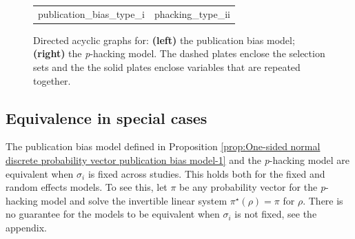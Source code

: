 \documentclass{article}
\theoremstyle{plain}
\theoremstyle{definition}
\begin{document}
\begin{figure}
\begin{center}     
 \begin{tabular}{cc}    
  {publication_bias_type_i} &     
  {phacking_type_ii}
 \end{tabular} 
\end{center}
\caption{\label{fig:Plate notation, publication bias and p-hacking} Directed acyclic graphs for: {\bf (left)}
the publication bias model; {\bf (right)} the \textit{p}-hacking model. The dashed plates enclose the selection sets and the the solid plates enclose variables that are repeated together.}
\end{figure}


\subsection{Equivalence in special cases}
The publication bias model defined in Proposition \ref{prop:One-sided normal discrete probability vector publication bias model-1} and the \textit{p}-hacking model are equivalent when $\sigma_{i}$ is fixed across studies. This holds both for the fixed and random effects models. To see this, let $\pi$ be any probability vector for the \textit{p}-hacking model and solve the invertible linear system $\pi^{\star}\left(\rho\right)=\pi$ for $\rho$. There is no guarantee for the models to be equivalent when $\sigma_{i}$ is not fixed, see the appendix.
\end{document}

